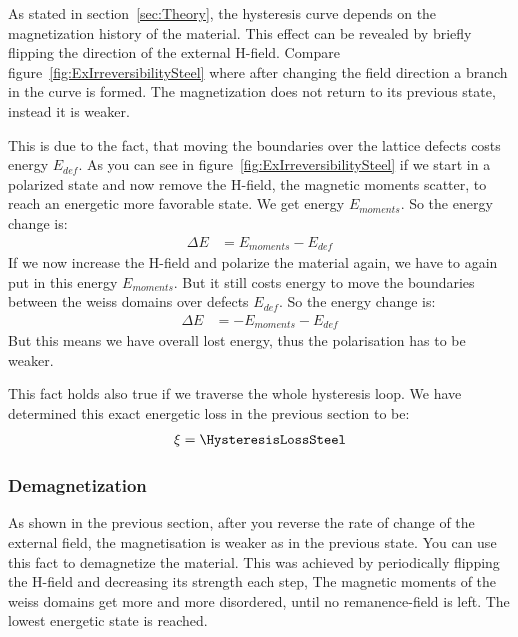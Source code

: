\documentclass[a4paper,10pt,twocolumn]{article}
\begin{document}
    As stated in section~\ref{sec:Theory}, the hysteresis curve depends on the magnetization history
    of the material. 
    This effect can be revealed by briefly flipping the direction of the external H-field.
    Compare figure~\ref{fig:ExIrreversibilitySteel} where after changing the field direction a branch in the curve
    is formed.
    The magnetization does not return to its previous state, instead it is weaker.
    
    This is due to the fact, that moving the boundaries over the lattice defects costs energy $E_{def}$.
    As you can see in figure~\ref{fig:ExIrreversibilitySteel} if we start in a polarized state
    and now remove the H-field, the magnetic moments scatter, to reach an energetic more favorable state.
    We get energy $E_{moments}$.
    So the energy change is:
    \begin{align*}
        \Delta E &= E_{moments} - E_{def}
    \end{align*}
    If we now increase the H-field and polarize the material again, we have to again put in this energy $E_{moments}$.
    But it still costs energy to move the boundaries between the weiss domains over defects $E_{def}$.
    So the energy change is:
    \begin{align*}
        \Delta E &= - E_{moments} - E_{def}
    \end{align*}
    But this means we have overall lost energy, thus the polarisation has to be weaker.
    
    This fact holds also true if we traverse the whole hysteresis loop.
    We have determined this exact energetic loss in the previous section to be:
    \begin{align*}
        \xi = \HysteresisLossSteel
    \end{align*}
    
    \subsubsection*{Demagnetization}
    
    
    As shown in the previous section, after you reverse the rate of change of the external field, the magnetisation
    is weaker as in the previous state.
    You can use this fact to demagnetize the material.
    This was achieved by periodically flipping the H-field and decreasing its strength each step,
    The magnetic moments of the weiss domains get more and more disordered, until no remanence-field is left.
    The lowest energetic state is reached.
    
\end{document}
